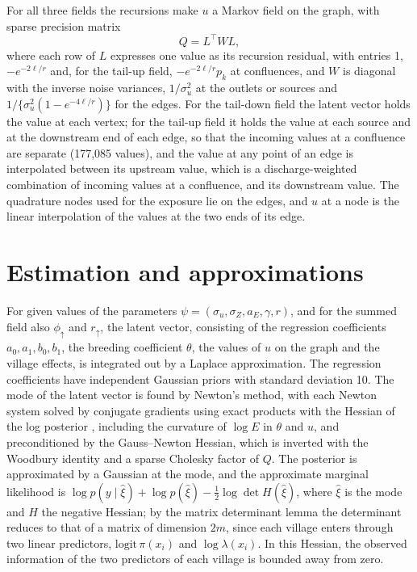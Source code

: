 \documentclass[11pt,a4paper]{article}
\begin{document}
For all three fields the recursions make $u$ a Markov field on the graph, with sparse precision matrix
\[
Q = L^\top W L,
\]
where each row of $L$ expresses one value as its recursion residual, with entries 1, $-e^{-2\ell/r}$ and, for the tail-up field, $-e^{-2\ell/r} p_k$ at confluences, and $W$ is diagonal with the inverse noise variances, $1/\sigma_u^2$ at the outlets or sources and $1/\{\sigma_u^2(1 - e^{-4\ell/r})\}$ for the edges. For the tail-down field the latent vector holds the value at each vertex; for the tail-up field it holds the value at each source and at the downstream end of each edge, so that the incoming values at a confluence are separate (177{,}085 values), and the value at any point of an edge is interpolated between its upstream value, which is a discharge-weighted combination of incoming values at a confluence, and its downstream value. The quadrature nodes used for the exposure lie on the edges, and $u$ at a node is the linear interpolation of the values at the two ends of its edge.

\section{Estimation and approximations}

For given values of the parameters $\psi = (\sigma_u, \sigma_Z, a_E, \gamma, r)$, and for the summed field also $\phi_\uparrow$ and $r_\uparrow$, the latent vector, consisting of the regression coefficients $a_0, a_1, b_0, b_1$, the breeding coefficient $\theta$, the values of $u$ on the graph and the village effects, is integrated out by a Laplace approximation. The regression coefficients have independent Gaussian priors with standard deviation 10. The mode of the latent vector is found by Newton's method, with each Newton system solved by conjugate gradients using exact products with the Hessian of the log posterior \citep{steihaug1983}, including the curvature of $\log E$ in $\theta$ and $u$, and preconditioned by the Gauss--Newton Hessian, which is inverted with the Woodbury identity and a sparse Cholesky factor of $Q$. The posterior is approximated by a Gaussian at the mode, and the approximate marginal likelihood is $\log p(y \mid \hat\xi) + \log p(\hat\xi) - \tfrac12 \log\det H(\hat\xi)$, where $\hat\xi$ is the mode and $H$ the negative Hessian; by the matrix determinant lemma the determinant reduces to that of a matrix of dimension $2m$, since each village enters through two linear predictors, $\mathrm{logit}\,\pi(x_i)$ and $\log\lambda(x_i)$. In this Hessian, the observed information of the two predictors of each village is bounded away from zero.
\end{document}
